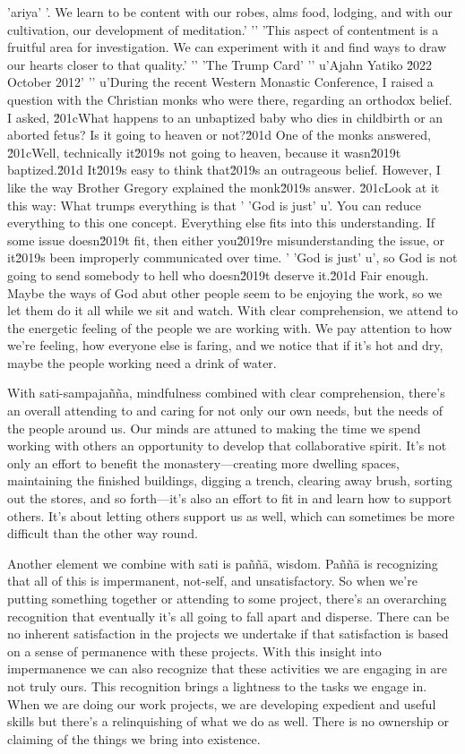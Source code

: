 'ariya'
'. We learn to be content with our robes, alms food, lodging, and with our cultivation, our development of meditation.'
'\n'
'This aspect of contentment is a fruitful area for investigation. We can experiment with it and find ways to draw our hearts closer to that quality.'
'\n'
'The Trump Card'
'\n'
u'Ajahn Yatiko \u2022 October 2012'
'\n'
u'During the recent Western Monastic Conference, I raised a question with the Christian monks who were there, regarding an orthodox belief. I asked, \u201cWhat happens to an unbaptized baby who dies in childbirth or an aborted fetus? Is it going to heaven or not?\u201d One of the monks answered, \u201cWell, technically it\u2019s not going to heaven, because it wasn\u2019t baptized.\u201d It\u2019s easy to think that\u2019s an outrageous belief. However, I like the way Brother Gregory explained the monk\u2019s answer. \u201cLook at it this way: What trumps everything is that '
'God is just'
u'. You can reduce everything to this one concept. Everything else fits into this understanding. If some issue doesn\u2019t fit, then either you\u2019re misunderstanding the issue, or it\u2019s been improperly communicated over time. '
'God is just'
u', so God is not going to send somebody to hell who doesn\u2019t deserve it.\u201d Fair enough. Maybe the ways of God abut other people 
seem to be enjoying the work, so we let them do it all while we sit and 
watch. With clear comprehension, we attend to the energetic feeling of 
the people we are working with. We pay attention to how we're feeling, 
how everyone else is faring, and we notice that if it's hot and dry, 
maybe the people working need a drink of water.

With sati-sampajañña, mindfulness combined with clear comprehension, 
there's an overall attending to and caring for not only our own needs, 
but the needs of the people around us. Our minds are attuned to making 
the time we spend working with others an opportunity to develop that 
collaborative spirit. It's not only an effort to benefit the 
monastery---creating more dwelling spaces, maintaining the finished 
buildings, digging a trench, clearing away brush, sorting out the 
stores, and so forth---it's also an effort to fit in and learn how to 
support others. It's about letting others support us as well, which can 
sometimes be more difficult than the other way round.

Another element we combine with sati is paññā, wisdom. Paññā is 
recognizing that all of this is impermanent, not-self, and 
unsatisfactory. So when we're putting something together or attending 
to some project, there's an overarching recognition that eventually 
it's all going to fall apart and disperse. There can be no inherent 
satisfaction in the projects we undertake if that satisfaction is based 
on a sense of permanence with these projects. With this insight into 
impermanence we can also recognize that these activities we are 
engaging in are not truly ours. This recognition brings a lightness to 
the tasks we engage in. When we are doing our work projects, we are 
developing expedient and useful skills but there's a relinquishing of 
what we do as well. There is no ownership or claiming of the things we 
bring into existence.

